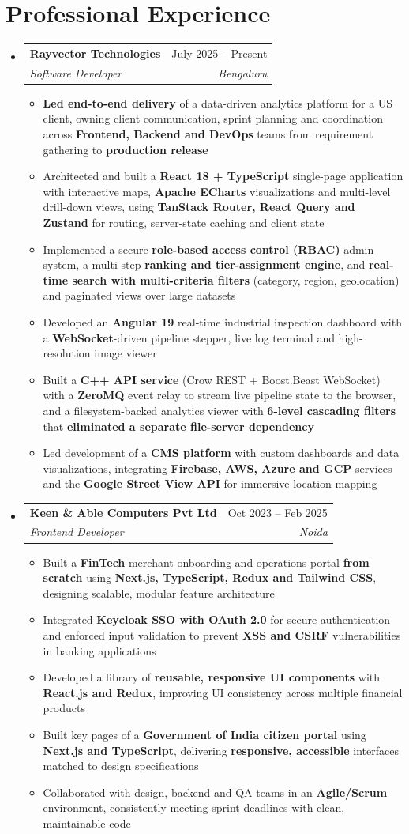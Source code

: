 \documentclass[a4paper,11pt]{article}
\makeatletter
\newcommand{\resumeItem}[1]{
  \item\small{#1}
}
\newcommand{\resumeItemListStart}{\begin{itemize}[rightmargin=0.11in, itemsep=0pt, parsep=0pt, topsep=1pt]}
\newcommand{\resumeItemListEnd}{\end{itemize}}
\newcommand{\resumeQuadHeading}[4]{
  \item
  \begin{tabular*}{0.96\textwidth}[t]{l@{\extracolsep{\fill}}r}
    \textbf{#1} & #2 \\
    \textit{\small#3} & \textit{\small #4} \\
  \end{tabular*}
}
\newcommand{\resumeHeadingListStart}{
  \begin{itemize}[leftmargin=0.15in, label={}]
}
\newcommand{\resumeHeadingListEnd}{\end{itemize}}
\makeatother
\begin{document}
\section{Professional Experience}
\resumeHeadingListStart{}
  \resumeQuadHeading{Rayvector Technologies}{July 2025 -- Present}
  {Software Developer}{Bengaluru}
    \resumeItemListStart{}
      \resumeItem{\textbf{Led end-to-end delivery} of a data-driven analytics platform for a US client, owning client communication, sprint planning and coordination across \textbf{Frontend, Backend and DevOps} teams from requirement gathering to \textbf{production release}}
      \resumeItem{Architected and built a \textbf{React 18 + TypeScript} single-page application with interactive maps, \textbf{Apache ECharts} visualizations and multi-level drill-down views, using \textbf{TanStack Router, React Query and Zustand} for routing, server-state caching and client state}
      \resumeItem{Implemented a secure \textbf{role-based access control (RBAC)} admin system, a multi-step \textbf{ranking and tier-assignment engine}, and \textbf{real-time search with multi-criteria filters} (category, region, geolocation) and paginated views over large datasets}
      \resumeItem{Developed an \textbf{Angular 19} real-time industrial inspection dashboard with a \textbf{WebSocket}-driven pipeline stepper, live log terminal and high-resolution image viewer}
      \resumeItem{Built a \textbf{C++ API service} (Crow REST + Boost.Beast WebSocket) with a \textbf{ZeroMQ} event relay to stream live pipeline state to the browser, and a filesystem-backed analytics viewer with \textbf{6-level cascading filters} that \textbf{eliminated a separate file-server dependency}}
      \resumeItem{Led development of a \textbf{CMS platform} with custom dashboards and data visualizations, integrating \textbf{Firebase, AWS, Azure and GCP} services and the \textbf{Google Street View API} for immersive location mapping}
    \resumeItemListEnd{}

  \resumeQuadHeading{Keen \& Able Computers Pvt Ltd}{Oct 2023 -- Feb 2025}
  {Frontend Developer}{Noida}
    \resumeItemListStart{}
      \resumeItem{Built a \textbf{FinTech} merchant-onboarding and operations portal \textbf{from scratch} using \textbf{Next.js, TypeScript, Redux and Tailwind CSS}, designing scalable, modular feature architecture}
      \resumeItem{Integrated \textbf{Keycloak SSO with OAuth 2.0} for secure authentication and enforced input validation to prevent \textbf{XSS and CSRF} vulnerabilities in banking applications}
      \resumeItem{Developed a library of \textbf{reusable, responsive UI components} with \textbf{React.js and Redux}, improving UI consistency across multiple financial products}
      \resumeItem{Built key pages of a \textbf{Government of India citizen portal} using \textbf{Next.js and TypeScript}, delivering \textbf{responsive, accessible} interfaces matched to design specifications}
      \resumeItem{Collaborated with design, backend and QA teams in an \textbf{Agile/Scrum} environment, consistently meeting sprint deadlines with clean, maintainable code}
    \resumeItemListEnd{}
\resumeHeadingListEnd{}
\end{document}
